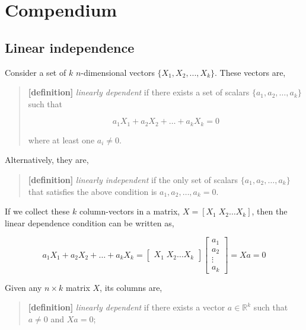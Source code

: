 \documentclass[
  letterpaper,
  DIV=11,
  numbers=noendperiod]{scrreprt}
\begin{document}

\hypertarget{sec-compendium}{%
\chapter{Compendium}\label{sec-compendium}}

\hypertarget{linear-independence}{%
\section{Linear independence}\label{linear-independence}}

Consider a set of \(k\) \(n\)-dimensional vectors
\(\{X_{1},X_{2},...,X_{k}\}\). These vectors are,

\begin{quote}
\textbf{{[}definition{]}} \emph{linearly dependent} if there exists a
set of scalars \(\{a_{1},a_{2},\dots,a_{k}\}\) such that

\[
a_1X_1 + a_2X_2+\ldots+a_kX_k=0
\]

where at least one \(a_i\neq0\).
\end{quote}

Alternatively, they are,

\begin{quote}
\textbf{{[}definition{]}} \emph{linearly independent} if the only set of
scalars \(\{a_{1},a_{2},\dots,a_{k}\}\) that satisfies the above
condition is \(a_1,a_2,\dots,a_k=0\).
\end{quote}

If we collect these \(k\) column-vectors in a matrix,
\(X=[X_1\;X_2 \dots X_k]\), then the linear dependence condition can be
written as,

\[
a_1X_1 + a_2X_2+\ldots+a_kX_k=\begin{bmatrix} X_1\;X_2 \dots X_k\end{bmatrix}\begin{bmatrix}a_1\\a_2\\\vdots\\a_k\end{bmatrix}=Xa = 0
\]

Given any \(n\times k\) matrix \(X\), its columns are,

\begin{quote}
\textbf{{[}definition{]}} \emph{linearly dependent} if there exists a
vector \(a\in\mathbb{R}^k\) such that \(a\neq0\) and \(Xa=0\);
\end{quote}
\end{document}
